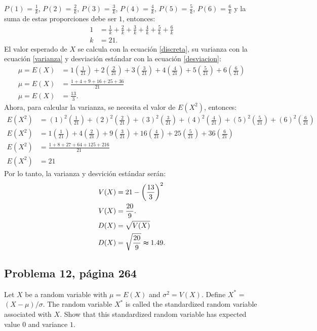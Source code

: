 \documentclass{article}
\begin{document}
\noindent $P(1)$ = $\frac{1}{k}$, $P(2)$ = $\frac{2}{k}$, $P(3)$ = $\frac{3}{k}$, $P(4)$ = $\frac{4}{k}$, $P(5)$ = $\frac{5}{k}$, $P(6)$ = $\frac{6}{k}$ y la suma de estas proporciones debe ser $1$, entonces:
\begin{align}
\nonumber
1 & = \frac{1}{k} + \frac{2}{k} + \frac{3}{k} + \frac{4}{k} + \frac{5}{k} + \frac{6}{k} \\ \nonumber
k & = 21.
\end{align}
El valor esperado de $X$ se calcula con la ecuación \ref{discreta}, su varianza con la ecuación \ref{varianza} y desviación estándar con la ecuación \ref{desviacion}:
\begin{align}
\nonumber
\mu = E{(X)} & = 1\left(\frac{1}{21}\right) + 2\left(\frac{2}{21}\right) + 3\left(\frac{3}{21}\right) + 4\left(\frac{4}{21}\right) + 5\left(\frac{5}{21}\right) + 6\left(\frac{6}{21}\right) \\ \nonumber
\mu = E{(X)} & = \frac{1+4+9+16+25+36}{21} \\ \nonumber
\mu = E{(X)} & = \frac{13}{3}.
\end{align}
Ahora, para calcular la varianza, se necesita el valor de $E(X^2)$, entonces:
\begin{align}
\nonumber
E{(X^2)}    & = (1)^2\left(\frac{1}{21}\right) + (2)^2\left(\frac{2}{21}\right) + (3)^2\left(\frac{3}{21}\right) + (4)^2\left(\frac{4}{21}\right) + (5)^2\left(\frac{5}{21}\right) + (6)^2\left(\frac{6}{21}\right)  \\ \nonumber
E{(X^2)}    & = 1\left(\frac{1}{21}\right) + 4\left(\frac{2}{21}\right) + 9\left(\frac{3}{21}\right) + 16\left(\frac{4}{21}\right) + 25\left(\frac{5}{21}\right) + 36\left(\frac{6}{21}\right) \\ \nonumber
E{(X^2)}    & = \frac{1+8+27+64+125+216}{21} \\ \nonumber
E{(X^2)}    & = 21
\end{align}
Por lo tanto, la varianza y desvición estándar serán:
\begin{align}
\nonumber
V{(X)} & =  21 - \left(\frac{13}{3}\right)^2 \\ \nonumber
V{(X)} & =\frac{20}{9}. \\ \nonumber
D{(X)} & = \sqrt{V(X)} \\ \nonumber
D{(X)} & = \sqrt{\frac{20}{9}} \thickapprox 1.49. 
\end{align}

\subsection{Problema 12, página 264}
Let $X$ be a random variable with $\mu = E{(X)}$ and $\sigma^2 = V{(X)}$. Define $X^*$ = $(X - \mu)/\sigma$. The random variable $X^*$ is called the standardized random variable associated with $X$. Show that this standardized random variable has expected value $0$ and variance $1$.
\end{document}
